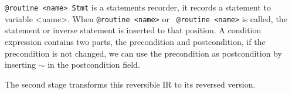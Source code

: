 \documentclass[aps,twocolumn,longbibliography,english,superscriptaddress,prr]{revtex4-1}
\newcommand{\<}{\langle}
\renewcommand{\>}{\rangle}
\newcommand{\ra}[1]{\renewcommand{\arraystretch}{#1}}
\theoremstyle{definition}\newtheorem{definition}{\textit{Definition}}
\begin{document}
    \texttt{@routine <name> Stmt} is a statements recorder, it records a statement to variable <name>. When \texttt{@routine <name>} or \texttt{~@routine <name>} is called, the statement or inverse statement is inserted to that position.
    A condition expression contains two parts, the precondition and postcondition, if the precondition is not changed, we can use the precondition as postcondition by inserting \texttt{$\sim$} in the postcondition field.
    
The second stage transforms this reversible IR to its reversed version.
\begin{table}[h!]\centering
\begin{minipage}{\columnwidth}
\ra{1.3}
\end{minipage}
\end{table}
\end{document}
